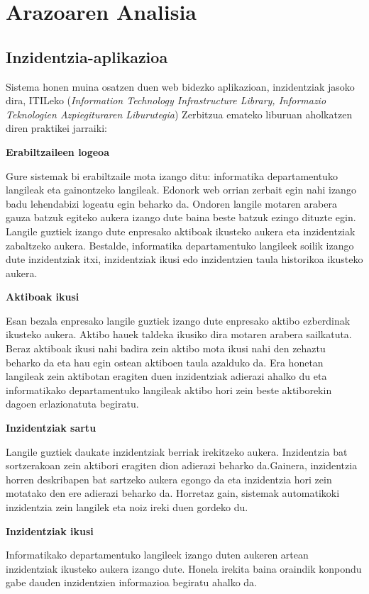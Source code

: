 \section{Arazoaren Analisia}

\subsection{Inzidentzia-aplikazioa}
\label{sec:ainf}
Sistema honen muina osatzen duen web bidezko aplikazioan, inzidentziak jasoko dira, ITILeko (\textit{Information Technology Infrastructure Library, Informazio Teknologien Azpiegituraren Liburutegia}) Zerbitzua emateko liburuan aholkatzen diren praktikei jarraiki:

\textbf{Erabiltzaileen logeoa}

Gure sistemak bi erabiltzaile mota izango ditu: informatika departamentuko langileak eta gainontzeko langileak. Edonork web orrian zerbait egin nahi izango badu lehendabizi logeatu egin beharko da. Ondoren langile motaren arabera gauza batzuk egiteko aukera izango dute baina beste batzuk ezingo dituzte egin. Langile guztiek izango dute enpresako aktiboak ikusteko aukera eta inzidentziak zabaltzeko aukera. Bestalde, informatika departamentuko langileek soilik izango dute inzidentziak itxi, inzidentziak ikusi edo inzidentzien taula historikoa ikusteko aukera.

\textbf{Aktiboak ikusi}

Esan bezala enpresako langile guztiek izango dute enpresako aktibo ezberdinak ikusteko aukera. Aktibo hauek taldeka ikusiko dira motaren arabera sailkatuta. Beraz aktiboak ikusi nahi badira zein aktibo mota ikusi nahi den zehaztu beharko da eta hau egin ostean aktiboen taula azalduko da. Era honetan langileak zein aktibotan eragiten duen inzidentziak adierazi ahalko du eta informatikako departamentuko langileak aktibo hori zein beste aktiborekin dagoen erlazionatuta begiratu.

\textbf{Inzidentziak sartu}

Langile guztiek daukate inzidentziak berriak irekitzeko aukera. Inzidentzia bat sortzerakoan zein aktibori eragiten dion adierazi beharko da.Gainera, inzidentzia horren deskribapen bat sartzeko aukera egongo da eta inzidentzia hori zein motatako den ere adierazi beharko da. Horretaz gain, sistemak automatikoki inzidentzia zein langilek eta noiz ireki duen gordeko du.

\textbf{Inzidentziak ikusi}

Informatikako departamentuko langileek izango duten aukeren artean inzidentziak ikusteko aukera izango dute. Honela irekita baina oraindik konpondu gabe dauden inzidentzien informazioa begiratu ahalko da.

